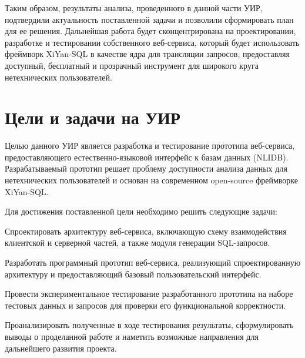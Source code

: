 Таким образом, результаты анализа, проведенного в данной части УИР, подтвердили актуальность
поставленной задачи и позволили сформировать план
для ее решения. Дальнейшая работа будет сконцентрирована на проектировании, разработке и
тестировании собственного веб-сервиса, который будет использовать фреймворк XiYan-SQL в качестве
ядра для трансляции запросов, предоставляя доступный, бесплатный и прозрачный инструмент для
широкого круга нетехнических пользователей.




\section{Цели и задачи на УИР}

Целью данного УИР является разработка и тестирование прототипа веб-сервиса,
предоставляющего естественно-языковой интерфейс к базам данных (NLIDB).
Разрабатываемый прототип решает проблему доступности анализа данных для нетехнических пользователей
и основан на современном open-source фреймворке XiYan-SQL.

Для достижения поставленной цели необходимо решить следующие задачи:
\begin{compactenum}
	\item Спроектировать архитектуру веб-сервиса, включающую схему взаимодействия клиентской и
	серверной частей, а также модуля генерации SQL-запросов.
	\item Разработать программный прототип веб-сервиса, реализующий спроектированную архитектуру и
	предоставляющий базовый пользовательский интерфейс.
	\item Провести экспериментальное тестирование разработанного прототипа на
	наборе тестовых данных и запросов для проверки его функциональной корректности.
	\item Проанализировать полученные в ходе тестирования результаты, сформулировать выводы о
	проделанной работе и наметить возможные направления для дальнейшего развития проекта.
\end{compactenum}